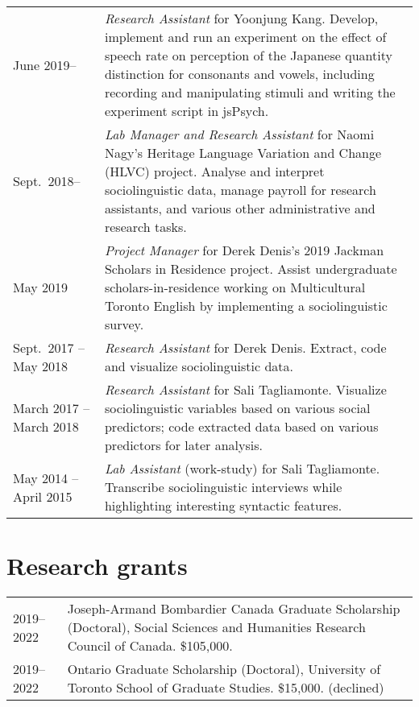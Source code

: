 \documentclass[letterpaper]{article}
\begin{document}
\begin{tabular}{p{}p{}}

    June 2019-- & \textit{Research Assistant} for Yoonjung Kang.
    Develop, implement and run an experiment on the effect of speech rate on
    perception of the Japanese quantity distinction for consonants and vowels,
    including recording and manipulating stimuli and writing the experiment
    script in jsPsych.
    \\

    Sept.\ 2018-- & \textit{Lab Manager and Research Assistant} for Naomi
    Nagy's Heritage Language Variation and Change (HLVC) project.
    Analyse and interpret sociolinguistic data,
    manage payroll for research assistants,
    and various other administrative and research tasks.
    \\

    May 2019 & \textit{Project Manager} for Derek Denis's 2019 Jackman
    Scholars in Residence project.
    Assist undergraduate scholars-in-residence working on Multicultural
    Toronto English by implementing a sociolinguistic survey.
    \\

    Sept.\ 2017 -- May 2018 & \textit{Research Assistant} for Derek Denis.
    Extract, code and visualize sociolinguistic data.
    \\

    March 2017 -- March 2018 & \textit{Research Assistant} for Sali Tagliamonte.
    Visualize sociolinguistic variables based on various social predictors; code
    extracted data based on various predictors for later analysis.
    \\

    May 2014 -- April 2015 & \textit{Lab Assistant} (work-study) for Sali
    Tagliamonte.
    Transcribe sociolinguistic interviews while highlighting
    interesting syntactic features.
    \\

\end{tabular}

\section*{Research grants}
\begin{tabular}{p{}p{}}
    2019--2022 & Joseph-Armand Bombardier Canada Graduate Scholarship
    (Doctoral), Social Sciences and Humanities Research Council of Canada.
    \$105,000. \\
    2019--2022 & Ontario Graduate Scholarship (Doctoral), University of Toronto
    School of Graduate Studies.
    \$15,000. (declined) \\
\end{tabular}
\end{document}
